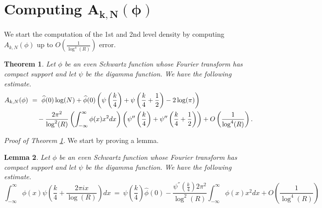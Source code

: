\documentclass[11pt, reqno]{amsart}
\newtheorem{theorem}{Theorem}[section]
\newtheorem{lemma}[theorem]{Lemma}
\theoremstyle{definition}
\theoremstyle{remark}
\numberwithin{equation}{section}
\renewcommand{\hat}{\widehat}
\begin{document}
\section{Computing \texorpdfstring{$\mathbf{A_{k,N}(\phi)}$}{A{k,N}(phi)}} \label{chp: A_k,N compute}
We start the computation of the 1st and 2nd level density by computing ${A_{k,N}(\phi)}$ up to $O\left(\frac{1}{\log^4(R)}\right)$ error. 
\begin{theorem}\label{gammaf}  Let $\phi$ be an even Schwartz function whose Fourier transform has compact support and let $\psi$ be the digamma function. We have the following estimate.
    \begin{align}
A_{k,N} (\phi)& \ = \ \hat\phi(0)\log(N) +\hat\phi(0)  \left(\psi\left(\frac{k}{4}\right)+\psi\left(\frac{k}{4}+ \frac{1}{2}\right)-2\log(\pi)\right) \notag \\ &~~~~- \frac{2\pi^2}{\log^2(R)}\left(\int_{-\infty}^\infty \phi(x)x^2 dx\right)\left(\psi''\left(\frac{k}{4}\right)+\psi''\left(\frac{k}{4}+ \frac{1}{2}\right)\right) +O\left(\frac{1}{\log^4(R)}\right).
\end{align} 
\end{theorem}
\textit{Proof of Theorem \ref{gammaf}.} We start by proving a lemma.
\begin{lemma}  Let $\phi$ be an even Schwartz function whose Fourier transform has compact support and let $\psi$ be the digamma function. We have the following estimate.
    \begin{equation}
        \int_{-\infty}^\infty \phi(x)\psi\left(\frac{k}{4}+ \frac{2\pi i x}{\log(R)}\right) dx \ =\ \psi\left(\frac{k}{4}\right)\hat\phi(0) -\frac{\psi^{''}(\frac{k}{4})2\pi^2}{\log^2(R)}\int_{-\infty}^\infty \phi(x)x^2 dx + O\left(\frac{1}{\log^4(R)}\right)
    \end{equation}
\end{lemma}
\end{document}
